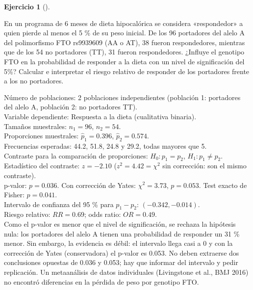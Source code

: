 \documentclass[
  spanish,
  a4paper,
]{scrreport}
\theoremstyle{definition}
\newtheorem{exercise}{Ejercicio}[chapter]
\theoremstyle{remark}
\begin{document}
\begin{exercise}[]\protect\hypertarget{exr-contraste-ia-comparacion-proporciones-fto-respuesta}{}\label{exr-contraste-ia-comparacion-proporciones-fto-respuesta}

En un programa de 6 meses de dieta hipocalórica se considera
«respondedor» a quien pierde al menos el 5 \% de su peso inicial. De los
96 portadores del alelo A del polimorfismo FTO rs9939609 (AA o AT), 38
fueron respondedores, mientras que de los 54 no portadores (TT), 31
fueron respondedores. ¿Influye el genotipo FTO en la probabilidad de
responder a la dieta con un nivel de significación del 5\%? Calcular e
interpretar el riesgo relativo de responder de los portadores frente a
los no portadores.

\end{exercise}

\begin{tcolorbox}[enhanced jigsaw, arc=.35mm, bottomrule=.15mm, bottomtitle=1mm, breakable, colback=white, colbacktitle=quarto-callout-tip-color!10!white, colframe=quarto-callout-tip-color-frame, coltitle=black, left=2mm, leftrule=.75mm, opacityback=0, opacitybacktitle=0.6, rightrule=.15mm, title=\textcolor{quarto-callout-tip-color}{\faLightbulb}\hspace{0.5em}{Solución}, titlerule=0mm, toprule=.15mm, toptitle=1mm]

Número de poblaciones: 2 poblaciones independientes (población 1:
portadores del alelo A, población 2: no portadores TT).\\
Variable dependiente: Respuesta a la dieta (cualitativa binaria).\\
Tamaños muestrales: \(n_1=96\), \(n_2=54\).\\
Proporciones muestrales: \(\hat p_1=0.396\), \(\hat p_2=0.574\).\\
Frecuencias esperadas: 44.2, 51.8, 24.8 y 29.2, todas mayores que 5.\\
Contraste para la comparación de proporciones: \(H_0:p_1=p_2\),
\(H_1:p_1\neq p_2\).\\
Estadístico del contraste: \(z=-2.10\) (\(z^2=4.42=\chi^2\) sin
corrección: son el mismo contraste).\\
p-valor: \(p=0.036\). Con corrección de Yates: \(\chi^2=3.73\),
\(p=0.053\). Test exacto de Fisher: \(p=0.041\).\\
Intervalo de confianza del 95 \% para \(p_1-p_2\):
\((-0.342, -0.014)\).\\
Riesgo relativo: \(RR=0.69\); odds ratio: \(OR=0.49\).\\
Como el p-valor es menor que el nivel de significación, se rechaza la
hipótesis nula: los portadores del alelo A tienen una probabilidad de
responder un 31 \% menor. Sin embargo, la evidencia es débil: el
intervalo llega casi a 0 y con la corrección de Yates (conservadora) el
p-valor es 0.053. No deben extraerse dos conclusiones opuestas de 0.036
y 0.053; hay que informar del intervalo y pedir replicación. Un
metaanálisis de datos individuales (Livingstone et al., BMJ 2016) no
encontró diferencias en la pérdida de peso por genotipo FTO.

\end{tcolorbox}
\end{document}
